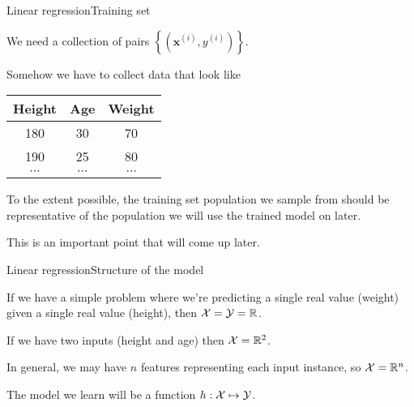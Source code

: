 \documentclass{beamer}
\renewcommand{\vec}[1]{\boldsymbol{#1}}
\def\Rset{\mathbb{R}}
\begin{document}
\begin{frame}{Linear regression}{Training set}

  We need a collection of pairs $\left\{(\vec{x}^{(i)},y^{(i)})\right\}$.

  \medskip

  Somehow we have to collect data that look like

  \medskip

  \begin{center}
    \begin{tabular}{ccc}
      \textbf{Height} & \textbf{Age} & \textbf{Weight} \\
      \hline
      180 & 30 & 70 \\
      190 & 25 & 80 \\
      $\cdots$ & $\cdots$ & $\cdots$ \\
    \end{tabular}
  \end{center}  

  \medskip

  To the extent possible, the training set population we sample from
  should be representative of the population we will use the trained
  model on later.

  \medskip

  This is an important point that will come up later.
  
\end{frame}


\begin{frame}{Linear regression}{Structure of the model}

  If we have a simple problem where we're predicting a single real
  value (weight) given a single real value (height), then ${\cal X} =
  {\cal Y} = \Rset$.

  \medskip

  If we have two inputs (height and age) then ${\cal X} = \Rset^2$.

  \medskip

  In general, we may have $n$ features representing each input instance,
  so ${\cal X} = \Rset^n$.

  \medskip

  The model we learn will be a function $h : {\cal X} \mapsto {\cal Y}$.
  
\end{frame}
\end{document}
